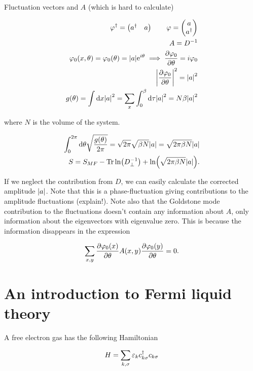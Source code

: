 Fluctuation vectors and $A$ (which is hard to calculate)

\begin{align*}
    \varphi^{\dagger} = \begin{pmatrix} a^{\dagger} & a \end{pmatrix} \quad \quad \varphi = \begin{pmatrix} a \\ a^{\dagger} \end{pmatrix} \\
    A = D^{-1} \\
    \varphi_0(x,\theta) = \varphi_0(\theta) = \abs{a}\mathrm{e}^{i\theta} \implies \pdv{\varphi_0}{\theta} = i\varphi_0 \\
    \abs{\pdv{\varphi_0}{\theta}}^2 = \abs{a}^2 \\
    g(\theta) = \int \dd x \abs{a}^2 = \sum_x \int_{0}^{\beta} \dd \tau \abs{a}^2 = N\beta \abs{a}^2 
\end{align*}

where $N$ is the volume of the system. 

\begin{align*}
    \int_{0}^{2\pi} \dd \theta \sqrt{\frac{g(\theta)}{2\pi}} = \sqrt{2\pi}\sqrt{\beta N} \abs{a} = \sqrt{2\pi \beta N} \abs{a} \\ 
    S = S_{MF} - \Tr \ln (D^{-1}_\perp ) + \ln(\sqrt{2\pi \beta N}\abs{a}). 
\end{align*}

If we neglect the contribution from $D$, we can easily calculate the corrected amplitude $\abs{a}$. Note that this is a phase-fluctuation giving contributions to the amplitude fluctuations (explain!). Note also that the Goldstone mode contribution to the fluctuations doesn't contain any information about $A$, only information about the eigenvectors with eigenvalue zero. This is because the information disappears in the expression 

\begin{align*}
    \sum_{x,y} \pdv{\varphi_0(x)}{\theta}A(x,y) \pdv{\varphi_0(y)}{\theta} = 0. 
\end{align*}

\section{An introduction to Fermi liquid theory}

A free electron gas has the following Hamiltonian 

\begin{align*}
    H = \sum_{k,\sigma} \varepsilon_k c^{\dagger}_{k\sigma}c_{k\sigma}
\end{align*}

